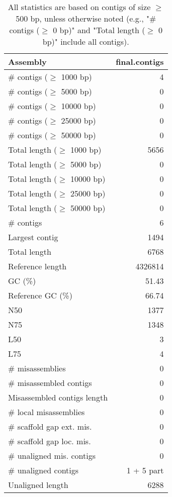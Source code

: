 \documentclass[12pt,a4paper]{article}
\begin{document}
\begin{table}[ht]
\begin{center}
\caption{All statistics are based on contigs of size $\geq$ 500 bp, unless otherwise noted (e.g., "\# contigs ($\geq$ 0 bp)" and "Total length ($\geq$ 0 bp)" include all contigs).}
\begin{tabular}{|l*{1}{|r}|}
\hline
Assembly & final.contigs \\ \hline
\# contigs ($\geq$ 1000 bp) & 4 \\ \hline
\# contigs ($\geq$ 5000 bp) & 0 \\ \hline
\# contigs ($\geq$ 10000 bp) & 0 \\ \hline
\# contigs ($\geq$ 25000 bp) & 0 \\ \hline
\# contigs ($\geq$ 50000 bp) & 0 \\ \hline
Total length ($\geq$ 1000 bp) & 5656 \\ \hline
Total length ($\geq$ 5000 bp) & 0 \\ \hline
Total length ($\geq$ 10000 bp) & 0 \\ \hline
Total length ($\geq$ 25000 bp) & 0 \\ \hline
Total length ($\geq$ 50000 bp) & 0 \\ \hline
\# contigs & 6 \\ \hline
Largest contig & 1494 \\ \hline
Total length & 6768 \\ \hline
Reference length & 4326814 \\ \hline
GC (\%) & 51.43 \\ \hline
Reference GC (\%) & 66.74 \\ \hline
N50 & 1377 \\ \hline
N75 & 1348 \\ \hline
L50 & 3 \\ \hline
L75 & 4 \\ \hline
\# misassemblies & 0 \\ \hline
\# misassembled contigs & 0 \\ \hline
Misassembled contigs length & 0 \\ \hline
\# local misassemblies & 0 \\ \hline
\# scaffold gap ext. mis. & 0 \\ \hline
\# scaffold gap loc. mis. & 0 \\ \hline
\# unaligned mis. contigs & 0 \\ \hline
\# unaligned contigs & 1 + 5 part \\ \hline
Unaligned length & 6288 \\ \hline

\end{tabular}
\end{center}
\end{table}
\end{document}
